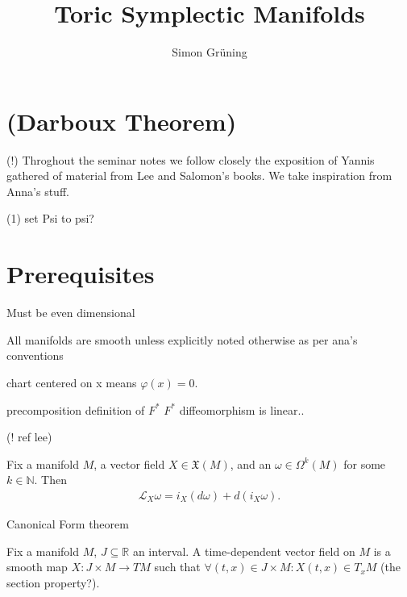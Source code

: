 


\title{Toric Symplectic Manifolds}
\author{Simon Gr\"uning}
\address[Simon Gr\"uning]{University of Zurich, R\"{a}mistrasse 71, 8006 Zurich}


\maketitle

\section*{(Darboux Theorem)}


\clearpage

(!) Throghout the seminar notes we follow closely the exposition of Yannis gathered of material from Lee and Salomon's books. We take inspiration from Anna's stuff.

(1) set Psi to psi?


\section{Prerequisites}

\begin{remark}
Must be even dimensional

All manifolds are smooth unless explicitly noted otherwise as per ana's conventions

chart centered on x means $\varphi(x) = 0$.


precomposition definition of $F^*$
$F^*$ diffeomorphism is linear..


\end{remark}

\begin{proposition}
(! ref lee)

Fix a manifold $M$, a vector field $X \in \mathfrak{X}(M)$, and an $\omega \in \Omega^k(M)$ for some $k \in \mathbb{N}$. Then
\begin{align*}
\mathcal{L}_X \omega = i_X(d \omega) + d(i_X \omega).
\end{align*}
\end{proposition}

\begin{theorem}\label{canform}
Canonical Form theorem
\end{theorem}

\begin{definition} \label{timvec}
Fix a manifold $M$, $J \subseteq \mathbb{R}$ an interval. A time-dependent vector field on $M$ is a smooth map $X: J \times M \to TM$ such that $\forall (t,x) \in J \times M: X(t,x) \in T_x M$ (the section property?).
\end{definition}

